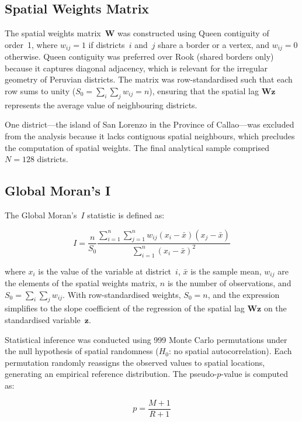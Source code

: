 \documentclass[12pt,a4paper,twoside]{article}
\begin{document}
\subsection{Spatial Weights Matrix}

The spatial weights matrix~$\mathbf{W}$ was constructed using Queen contiguity
of order~1, where $w_{ij} = 1$ if districts~$i$ and~$j$ share a border or a
vertex, and $w_{ij} = 0$ otherwise. Queen contiguity was preferred over Rook
(shared borders only) because it captures diagonal adjacency, which is relevant
for the irregular geometry of Peruvian districts. The matrix was row-standardised
such that each row sums to unity ($S_0 = \sum_i \sum_j w_{ij} = n$), ensuring
that the spatial lag $\mathbf{Wz}$ represents the average value of neighbouring
districts.

One district---the island of San Lorenzo in the Province of Callao---was excluded
from the analysis because it lacks contiguous spatial neighbours, which precludes
the computation of spatial weights. The final analytical sample comprised
$N = 128$ districts.

\subsection{Global Moran's I}

The Global Moran's~$I$ statistic is defined as:

\begin{equation}\label{eq:moran}
  I = \frac{n}{S_0}
      \frac{\sum_{i=1}^{n} \sum_{j=1}^{n} w_{ij} (x_i - \bar{x})(x_j - \bar{x})}
           {\sum_{i=1}^{n} (x_i - \bar{x})^2}
\end{equation}

where $x_i$ is the value of the variable at district~$i$, $\bar{x}$ is the sample
mean, $w_{ij}$ are the elements of the spatial weights matrix, $n$ is the number
of observations, and $S_0 = \sum_i \sum_j w_{ij}$. With row-standardised weights,
$S_0 = n$, and the expression simplifies to the slope coefficient of the
regression of the spatial lag $\mathbf{Wz}$ on the standardised variable~$\mathbf{z}$.

Statistical inference was conducted using 999 Monte Carlo permutations under the
null hypothesis of spatial randomness ($H_0$: no spatial autocorrelation). Each
permutation randomly reassigns the observed values to spatial locations, generating
an empirical reference distribution. The pseudo-$p$-value is computed as:

\begin{equation}\label{eq:pvalue}
  p = \frac{M + 1}{R + 1}
\end{equation}
\end{document}
